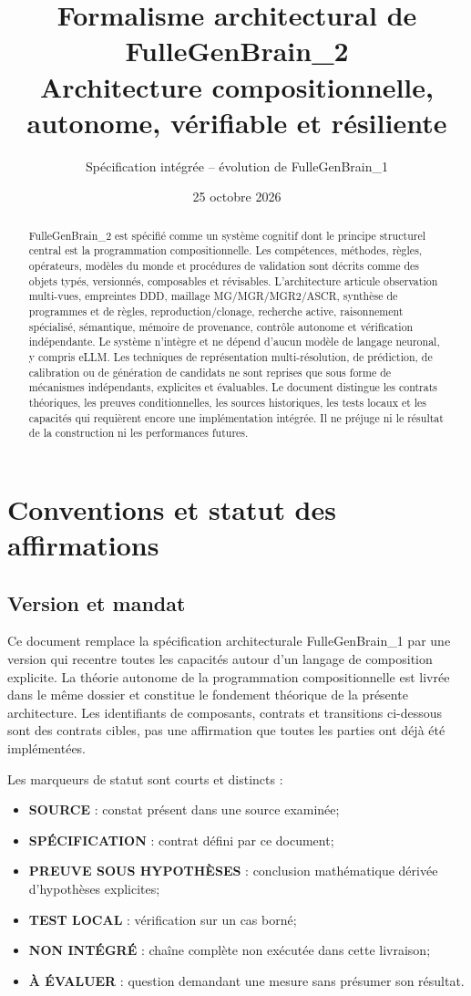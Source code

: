 \documentclass[11pt,a4paper]{article}
\title{Formalisme architectural de FulleGenBrain\_2\\
\large Architecture compositionnelle, autonome, vérifiable et résiliente}
\author{Spécification intégrée -- évolution de FulleGenBrain\_1}
\date{25 octobre 2026}
\newcommand{\Role}[1]{\textbf{#1}}
\begin{document}
\maketitle
\begin{abstract}
FulleGenBrain\_2 est spécifié comme un système cognitif dont le principe structurel central est la programmation compositionnelle. Les compétences, méthodes, règles, opérateurs, modèles du monde et procédures de validation sont décrits comme des objets typés, versionnés, composables et révisables. L'architecture articule observation multi-vues, empreintes DDD, maillage MG/MGR/MGR2/ASCR, synthèse de programmes et de règles, reproduction/clonage, recherche active, raisonnement spécialisé, sémantique, mémoire de provenance, contrôle autonome et vérification indépendante. Le système n'intègre et ne dépend d'aucun modèle de langage neuronal, y compris eLLM. Les techniques de représentation multi-résolution, de prédiction, de calibration ou de génération de candidats ne sont reprises que sous forme de mécanismes indépendants, explicites et évaluables. Le document distingue les contrats théoriques, les preuves conditionnelles, les sources historiques, les tests locaux et les capacités qui requièrent encore une implémentation intégrée. Il ne préjuge ni le résultat de la construction ni les performances futures.
\end{abstract}
\newpage\setcounter{tocdepth}{1}\tableofcontents\newpage

\section{Conventions et statut des affirmations}
\subsection{Version et mandat}
Ce document remplace la spécification architecturale FulleGenBrain\_1 par une version qui recentre toutes les capacités autour d'un langage de composition explicite. La théorie autonome de la programmation compositionnelle est livrée dans le même dossier et constitue le fondement théorique de la présente architecture. Les identifiants de composants, contrats et transitions ci-dessous sont des contrats cibles, pas une affirmation que toutes les parties ont déjà été implémentées.

Les marqueurs de statut sont courts et distincts :
\begin{itemize}
\item \Role{SOURCE} : constat présent dans une source examinée;
\item \Role{SPÉCIFICATION} : contrat défini par ce document;
\item \Role{PREUVE SOUS HYPOTHÈSES} : conclusion mathématique dérivée d'hypothèses explicites;
\item \Role{TEST LOCAL} : vérification sur un cas borné;
\item \Role{NON INTÉGRÉ} : chaîne complète non exécutée dans cette livraison;
\item \Role{À ÉVALUER} : question demandant une mesure sans présumer son résultat.
\end{itemize}
\end{document}
